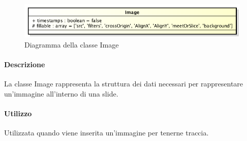 	\begin{figure}[h]
		\centering
		\includegraphics[width=0.5\linewidth]{img/back_end_premi_model_image}
		\caption[Diagramma della classe Image]{Diagramma della classe Image}
		\label{fig:back_end_premi_model_image}
	\end{figure}


	\paragraph{Descrizione}
	La classe Image rappresenta la struttura dei dati necessari per rappresentare un'immagine all'interno di una slide.
	
	\paragraph{Utilizzo}
	Utilizzata quando viene inserita un'immagine per tenerne traccia.
	
